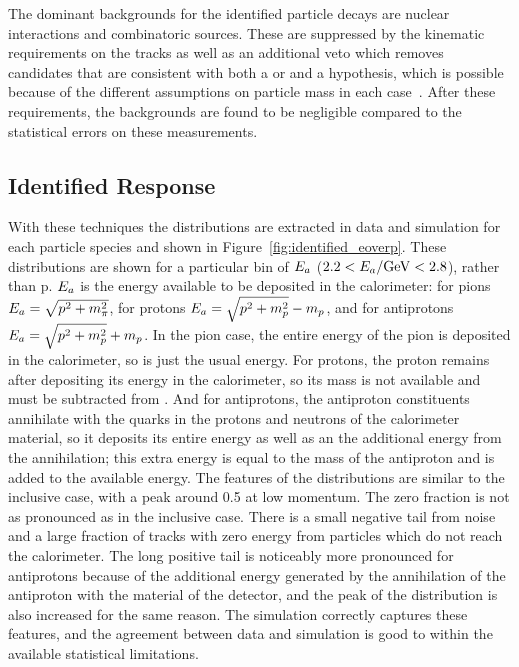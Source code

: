 The dominant backgrounds for the identified particle decays are nuclear interactions and combinatoric sources.
These are suppressed by the kinematic requirements on the tracks as well as an additional veto which removes candidates that are consistent with both a \pL or \pLB and a \pKS hypothesis, which is possible because of the different assumptions on particle mass in each case~\cite{PERF-2011-05}.
After these requirements, the backgrounds are found to be negligible compared to the statistical errors on these measurements. 

\subsection{Identified Response}
With these techniques the \ep distributions are extracted in data and simulation for each particle species and shown in Figure~\ref{fig:identified_eoverp}. 
These distributions are shown for a particular bin of $E_a$ ($2.2 < E_a / \mathrm{Ge\kern -0.05em V} < 2.8$),  rather than p. 
$E_a$ is the energy available to be deposited in the calorimeter: for pions $E_a = \sqrt{p^2 + m_\pi^2}$, for protons $E_a = \sqrt{p^2 + m_p^2} - m_p$, and for antiprotons $E_a = \sqrt{p^2 + m_p^2} + m_p$.
In the pion case, the entire energy of the pion is deposited in the calorimeter, so \Ea is just the usual energy.
For protons, the proton remains after depositing its energy in the calorimeter, so its mass is not available and must be subtracted from \Ea.
And for antiprotons, the antiproton constituents annihilate with the quarks in the protons and neutrons of the calorimeter material, so it deposits its entire energy as well as an the additional energy from the annihilation; this extra energy is equal to the mass of the antiproton and is added to the available energy.
The features of the \ep distributions are similar to the inclusive case, with a peak around 0.5 at low momentum.
The zero fraction is not as pronounced as in the inclusive case.
There is a small negative tail from noise and a large fraction of tracks with zero energy from particles which do not reach the calorimeter.
The long positive tail is noticeably more pronounced for antiprotons because of the additional energy generated by the annihilation of the antiproton with the material of the detector, and the peak of the distribution is also increased for the same reason.
The simulation correctly captures these features, and the agreement between data and simulation is good to within the available statistical limitations.


